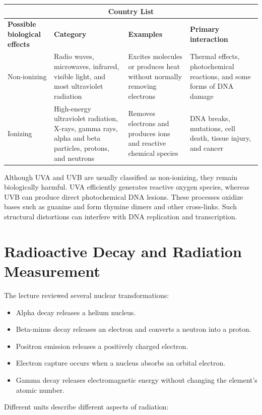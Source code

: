 \documentclass[12pt]{article}
\begin{document}
\begin{tabular}{ |p{3cm}||p{3cm}|p{3cm}|p{3cm}|  }
 \hline
 \multicolumn{4}{|c|}{Country List} \\
 \hline
 \textbf{Possible biological effects} & \textbf{Category} & \textbf{Examples}& \textbf{Primary interaction} \\
 \hline
 Non-ionizing &
Radio waves, microwaves, infrared, visible light, and most ultraviolet
radiation &
Excites molecules or produces heat without normally removing electrons &
Thermal effects, photochemical reactions, and some forms of DNA damage \\
 Ionizing &
High-energy ultraviolet radiation, X-rays, gamma rays, alpha and beta
particles, protons, and neutrons &
Removes electrons and produces ions and reactive chemical species &
DNA breaks, mutations, cell death, tissue injury, and cancer \\
 
 \hline
\end{tabular}


Although UVA and UVB are usually classified as non-ionizing, they remain
biologically harmful. UVA efficiently generates reactive oxygen species,
whereas UVB can produce direct photochemical DNA lesions. These processes
oxidize bases such as guanine and form thymine dimers and other cross-links.
Such structural distortions can interfere with DNA replication and
transcription.

\section{Radioactive Decay and Radiation Measurement}

The lecture reviewed several nuclear transformations:

\begin{itemize}
    \item Alpha decay releases a helium nucleus.
    \item Beta-minus decay releases an electron and converts a neutron into a
    proton.
    \item Positron emission releases a positively charged electron.
    \item Electron capture occurs when a nucleus absorbs an orbital electron.
    \item Gamma decay releases electromagnetic energy without changing the
    element's atomic number.
\end{itemize}

Different units describe different aspects of radiation:
\end{document}
